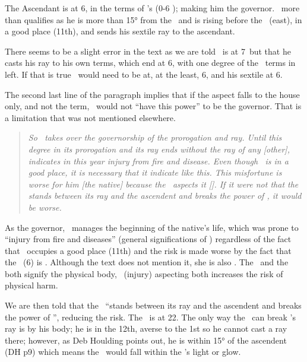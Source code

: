 The Ascendant is at 6\Scorpio, in the terms of \Mars's (0-6 \Scorpio); making him the governor. \Mars\, more than qualifies as he is more than 15° from the \Sun\, and is rising before the \Sun\, (east), in a good place (11th), and sends his sextile ray to the ascendant. 

There seems to be a slight error in the text as we are told \Mars\, is at 7\Virgo\, but that he casts his ray to his own terms, which end at 6\Scorpio, with one degree of the \Mars\, terms in \Scorpio\, left. If that is true \Mars\, would need to be at, at the least, 6\Virgo, and his sextile at 6\Scorpio. 

The second last line of the paragraph implies that if the aspect falls to the house only, and not the term, \Mars\, would not ``have this power'' to be the governor. That is a limitation that was not mentioned elsewhere.

\begin{quote}
\textsl{So \Mars\, takes over the governorship of the prorogation and ray. Until this degree in its prorogation and its ray ends without the ray of any [other], \Mars\, indicates in this year injury from fire and disease. Even though \Mars\, is in a good place, it is necessary that it indicate like this. This misfortune is worse for him [the native] because the \Moon\, aspects it [\Mars]. If it were not that the \Sun\, stands between its ray and the ascendent and breaks the power of \Mars, it would be worse.}
\end{quote}

As the governor, \Mars\, manages the beginning of the native's life, which was prone to ``injury from fire and diseases'' (general significations of \Mars) regardless of the fact that \Mars\, occupies a good place (11th) and the risk is made worse by the fact that the \Moon\, (6\Cancer) is \Sextile\Mars. Although the text does not mention it, she is also \Trine\ASC. The \Moon\, and the \ASC\, both signify the physical body, \Mars\, (injury) aspecting both increases the risk of physical harm.

We are then told that the \Sun\, ``stands between its ray and the ascendent and breaks the power of \Mars'', reducing the risk. The \Sun\, is at 22\Libra. The only way the \Sun\, can break \Mars's ray is by his body; he is in the 12th, averse to the 1st so he cannot cast a ray there; however, as Deb Houlding points out, he is within 15° of the ascendent (DH p9) which means the \ASC\, would fall within the \Sun's light or glow.

